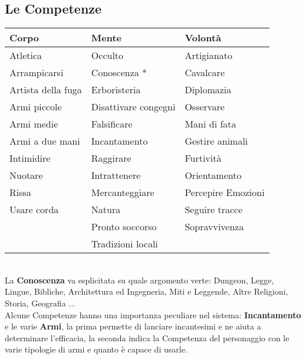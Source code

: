 \documentclass[12pt,a4paper,twoside,openany]{book}
\begin{document}
\subsection{Le Competenze}

\begin{tabular*}{0.93\linewidth}{@{\extracolsep{\fill}}lll}
\textbf{Corpo} & \textbf{Mente} & \textbf{Volontà}\\
\toprule
Atletica				& Occulto					& Artigianato			\\	
Arrampicarsi			& Conoscenza *				& Cavalcare				\\
Artista della fuga		& Erboristeria				& Diplomazia			\\
Armi piccole 			& Disattivare congegni		& Osservare	\\
Armi medie 				& Falsificare				& Mani di fata\\
Armi a due mani			& Incantamento				& Gestire animali\\
Intimidire		 		& Raggirare					& Furtività\\
Nuotare					& Intrattenere				& Orientamento\\
Rissa					& Mercanteggiare			& Percepire Emozioni \\ 
Usare corda		 		& Natura					& Seguire tracce\\
						& Pronto soccorso			& Sopravvivenza\\
						& Tradizioni locali			& \\

\end{tabular*}\\

La \textbf{Conoscenza} va esplicitata su quale argomento verte: Dungeon, Legge, Lingue, Bibliche, Architettura ed Ingegneria, Miti e Leggende, Altre Religioni, Storia, Geografia ...\\

Alcune Competenze hanno una importanza peculiare nel sistema: \textbf{Incantamento} e le varie \textbf{Armi}, la prima permette di lanciare incantesimi e ne aiuta a determinare l'efficacia, la seconda indica la Competenza del personaggio con le varie tipologie di armi e quanto è capace di usarle.
\end{document}
